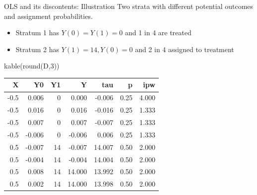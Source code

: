 \documentclass[
  11pt,
  ignorenonframetext,
]{beamer}
\newenvironment{Shaded}{\begin{snugshade}}{\end{snugshade}}
\newcommand{\DecValTok}[1]{\textcolor[rgb]{0.68,0.00,0.00}{#1}}
\newcommand{\FunctionTok}[1]{\textcolor[rgb]{0.28,0.35,0.67}{#1}}
\newcommand{\NormalTok}[1]{\textcolor[rgb]{0.00,0.23,0.31}{#1}}
\providecommand{\tightlist}{%
  \setlength{\itemsep}{0pt}\setlength{\parskip}{0pt}}\usepackage{longtable,booktabs,array}
\begin{document}
\begin{frame}[fragile]{OLS and its discontents: Illustration}
\protect\hypertarget{ols-and-its-discontents-illustration-1}{}
Two strata with different potential outcomes and assignment
probabilities.

\begin{itemize}
\tightlist
\item
  Stratum 1 has \(Y(0)=Y(1)=0\) and 1 in 4 are treated
\item
  Stratum 2 has \(Y(1)=14, Y(0)=0\) and 2 in 4 assigned to treatment
\end{itemize}

\begin{Shaded}
\begin{Highlighting}[]
\FunctionTok{kable}\NormalTok{(}\FunctionTok{round}\NormalTok{(D,}\DecValTok{3}\NormalTok{))}
\end{Highlighting}
\end{Shaded}

\begin{tabular}{r|r|r|r|r|r|r}
\hline
X & Y0 & Y1 & Y & tau & p & ipw\\
\hline
-0.5 & 0.006 & 0 & 0.000 & -0.006 & 0.25 & 4.000\\
\hline
-0.5 & 0.016 & 0 & 0.016 & -0.016 & 0.25 & 1.333\\
\hline
-0.5 & 0.007 & 0 & 0.007 & -0.007 & 0.25 & 1.333\\
\hline
-0.5 & -0.006 & 0 & -0.006 & 0.006 & 0.25 & 1.333\\
\hline
0.5 & -0.007 & 14 & -0.007 & 14.007 & 0.50 & 2.000\\
\hline
0.5 & -0.004 & 14 & -0.004 & 14.004 & 0.50 & 2.000\\
\hline
0.5 & 0.008 & 14 & 14.000 & 13.992 & 0.50 & 2.000\\
\hline
0.5 & 0.002 & 14 & 14.000 & 13.998 & 0.50 & 2.000\\
\hline
\end{tabular}
\end{frame}
\end{document}
